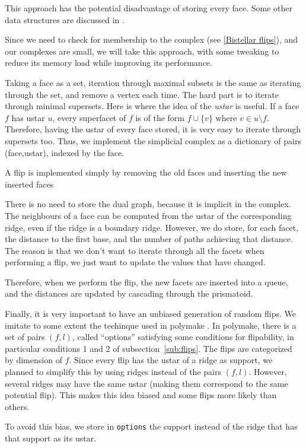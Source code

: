 \documentclass[12pt,a4paper]{article}
\theoremstyle{plain}
\theoremstyle{definition}
\begin{document}
This approach has the potential disadvantage of storing every face. Some other data structures are discussed in \cite{data structure}.

Since we need to check for membership to the complex (see \ref{Bistellar flips}), and our complexes are small, we will take this approach, with some tweaking to reduce its memory load while improving its performance.

Taking a face as a set, iteration through maximal subsets is the same as iterating through the set, and remove a vertex each time. The hard part is to iterate through minimal supersets.
%
Here is where the idea of the \emph{ustar} is useful. If a face $f$ has ustar $u$, every superfacet of $f$ is of the form $f\cup\{v\}$ where $v\in u\setminus f$. Therefore, having the ustar of every face stored, it is very easy to iterate through supersets too.
%
Thus, we implement the simplicial complex as a dictionary of pairs (face,ustar), indexed by the face.

A flip is implemented simply by removing the old faces and inserting the new inserted faces

There is no need to store the dual graph, because it is implicit in the complex. The neighbours of a face can be computed from the ustar of the corresponding ridge, even if the ridge is a boundary ridge. However, we do store, for each facet, the distance to the first base, and the number of paths achieving that distance. The reason is that we don't want to iterate through all the facets when performing a flip, we just want to update the values that have changed.

Therefore, when we perform the flip, the new facets are inserted into a queue, and the distances are updated by cascading through the prismatoid.

Finally, it is very important to have an unbiased generation of random flips. We imitate to some extent the techinque used in polymake \cite{polymake}. In polymake, there is a set of pairs $(f,l)$, called ``options'' satisfying some conditions for flipability, in particular conditions 1 and 2 of subsection~\ref{sub:flips}. The flips are categorized by dimension of $f$.
%
Since every flip has the ustar of a ridge as support, we planned to simplify this by using ridges instead of the pairs $(f,l)$. However, several ridges may have the same ustar (making them correspond to the same potential flip). This makes this idea biased and some flips more likely than others.

To avoid this bias, we store in \lstinline{options} the support instead of the ridge that has that support as its ustar.
\end{document}
